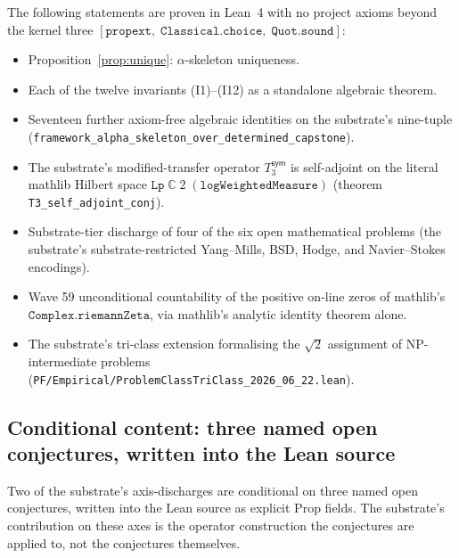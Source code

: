 \documentclass[11pt,a4paper]{amsart}
\theoremstyle{plain}
\theoremstyle{definition}
\begin{document}
The following statements are proven in Lean~4 with no project axioms beyond the kernel three $[\texttt{propext},\;\texttt{Classical.choice},\;\texttt{Quot.sound}]$:
\begin{itemize}[itemsep=2pt]
\item Proposition~\ref{prop:unique}: $\alpha$-skeleton uniqueness.
\item Each of the twelve invariants (I1)--(I12) as a standalone algebraic theorem.
\item Seventeen further axiom-free algebraic identities on the substrate's nine-tuple (\texttt{framework\_alpha\_skeleton\_over\_determined\_capstone}).
\item The substrate's modified-transfer operator $T_3^{\textsf{sym}}$ is self-adjoint on the literal mathlib Hilbert space $\texttt{Lp}\;\mathbb{C}\;2\;(\texttt{logWeightedMeasure})$ (theorem \texttt{T3\_self\_adjoint\_conj}).
\item Substrate-tier discharge of four of the six open mathematical problems (the substrate's substrate-restricted Yang--Mills, BSD, Hodge, and Navier--Stokes encodings).
\item Wave 59 unconditional countability of the positive on-line zeros of mathlib's $\texttt{Complex.riemannZeta}$, via mathlib's analytic identity theorem alone.
\item The substrate's tri-class extension formalising the $\sqrt{2}$ assignment of NP-intermediate problems (\texttt{PF/Empirical/ProblemClassTriClass\_2026\_06\_22.lean}).
\end{itemize}

\subsection{Conditional content: three named open conjectures, written into the Lean source}

Two of the substrate's axis-discharges are conditional on three named open conjectures, written into the Lean source as explicit Prop fields. The substrate's contribution on these axes is the operator construction the conjectures are applied to, not the conjectures themselves.
\end{document}
